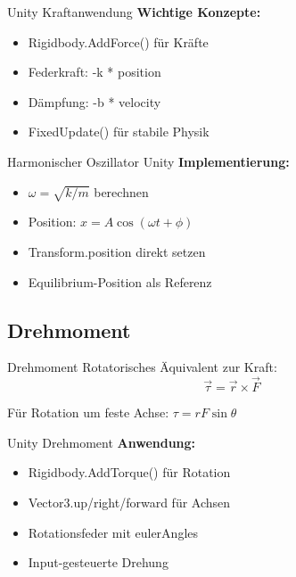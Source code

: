 \begin{concept}{Unity Kraftanwendung}
    \textbf{Wichtige Konzepte:}
    \begin{itemize}
        \item Rigidbody.AddForce() für Kräfte
        \item Federkraft: -k * position
        \item Dämpfung: -b * velocity
        \item FixedUpdate() für stabile Physik
    \end{itemize}
\end{concept}

\begin{concept}{Harmonischer Oszillator Unity}
    \textbf{Implementierung:}
    \begin{itemize}
        \item $\omega = \sqrt{k/m}$ berechnen
        \item Position: $x = A\cos(\omega t + \phi)$
        \item Transform.position direkt setzen
        \item Equilibrium-Position als Referenz
    \end{itemize}
\end{concept}

\multend

\subsection{Drehmoment}


\begin{definition}{Drehmoment}
    Rotatorisches Äquivalent zur Kraft:
    $$\vec{\tau} = \vec{r} \times \vec{F}$$
    
    Für Rotation um feste Achse: $\tau = rF\sin\theta$
\end{definition}

\begin{concept}{Unity Drehmoment}
    \textbf{Anwendung:}
    \begin{itemize}
        \item Rigidbody.AddTorque() für Rotation
        \item Vector3.up/right/forward für Achsen
        \item Rotationsfeder mit eulerAngles
        \item Input-gesteuerte Drehung
    \end{itemize}
\end{concept}

